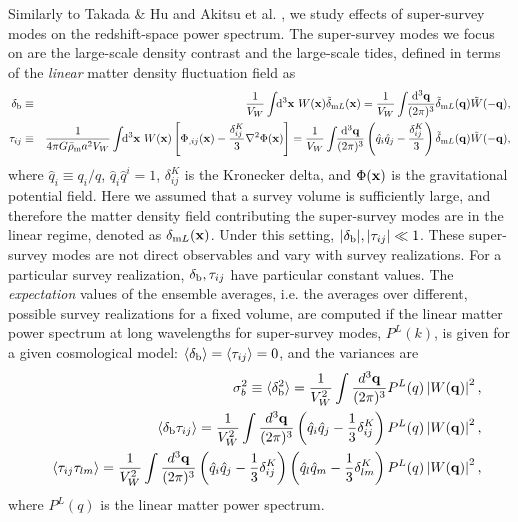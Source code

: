 \documentclass[prd,onecolumn,notitlepage,amsmath,amssymb,floatfix,superscriptaddress]{revtex4-1}
\newcommand{\bx}{{\bf x}}
\newcommand{\bq}{{\bf q}}
\newcommand{\hq}{\hat{q}}
\newcommand{\tW}{\tilde{W}}
\newcommand{\br}{{\rm b}}
\newcommand{\dml}{\delta_{{\rm m}L}}
\newcommand{\tdml}{\tilde{\delta}_{{\rm m}L}}
\def\avrg#1{\left\langle #1 \right\rangle}
\begin{document}
Similarly to Takada \& Hu \cite{TakadaHu:13} and Akitsu et al. \cite{Akitsuetal:17}, 
we study effects of super-survey modes on the redshift-space power spectrum. The super-survey modes we focus on are
 the large-scale density contrast and the large-scale tides, defined 
in terms of the {\it linear} matter density fluctuation field
as
%
\begin{eqnarray}
\delta_\br&\equiv& \frac{1}{V_W}\int\!\!\mathrm{d}^3\bx~ W(\bx)
\tdml(\bx)
=\frac{1}{V_W}\int\!\!\frac{\mathrm{d}^3\bq}{(2\pi)^3}
\tdml(\bq)\tW(-\bq), \nonumber\\
\tau_{ij} &\equiv & \frac{1}{4\pi G\bar{\rho}_{\rm m} a^2 V_W}\int\!\!\mathrm{d}^3\bx~W(\bx)\left[
\Phi_{,ij}(\bx)-\frac{\delta^K_{ij}}{3}\nabla^2\Phi(\bx)\right]
=\frac{1}{V_W}\int\!\!\frac{\mathrm{d}^3\bq}{(2\pi)^3}\left(\hat{q}_i\hat{q}_j-\frac{\delta^K_{ij}}{3}\right)\tdml(\bq)\tW(-\bq), 
\end{eqnarray}
%
where $\hq_i\equiv q_i/q$, $\hq_i \hq^i=1$, $\delta^K_{ij}$ is the Kronecker delta, and $\Phi(\bx)$ is the 
gravitational potential field. Here 
we assumed that a survey volume is sufficiently large, and therefore the matter density field contributing
 the super-survey modes are 
in the linear regime, denoted as $\dml(\bx)$. Under this setting, $|\delta_\br|, |\tau_{ij}|\ll 1$.
These super-survey modes are not direct observables and vary with survey realizations. For a particular 
survey realization, $\delta_\br, \tau_{ij}$ have 
particular constant values.
The {\em expectation} values of the ensemble averages, i.e. the averages over different, possible survey realizations for a fixed volume, 
are computed if the linear matter power spectrum at long wavelengths for super-survey modes,  
$P^L(k)$, 
is given for a given cosmological model:
$\avrg{\delta_\br}=\avrg{\tau_{ij}}=0$, and the variances are 
%
\begin{eqnarray}
&&\sigma_b^2\equiv \langle \delta_\br^2 \rangle = \frac{1}{V_W^2}\int \frac{d^3 \bq}{(2\pi)^3} 
P^L(q) \left| W(\bq) \right|^2, \nonumber \\ 
&&\langle \delta_\br \tau_{ij} \rangle = \frac{1}{V_W^2}\int \frac{d^3 \bq}{(2\pi)^3} 
\left( \hat{q}_i \hat{q}_j -\frac{1}{3}\delta^{K}_{ij} \right)P^L(q) \left| W(\bq) \right|^2,   \nonumber\\
&&\langle \tau_{ij} \tau_{lm} \rangle =  \frac{1}{V_W^2}\int \frac{d^3 \bq}{(2\pi)^3} 
\left( \hat{q}_i \hat{q}_j -\frac{1}{3}\delta^{K}_{ij} \right)\left( \hat{q}_l \hat{q}_m -\frac{1}{3}\delta^{K}_{lm} \right)
P^L(q) \left| W(\bq) \right|^2, \label{eq:sigma_tau} 
\end{eqnarray}
%
where $P^L(q)$ is the linear matter power spectrum. 
\end{document}
